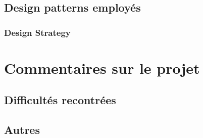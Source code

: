 \documentclass{article}
\begin{document}
    \subsection{Design patterns employés}

        \subsubsection{Design Strategy}
        
\section{Commentaires sur le projet}

    \subsection{Difficultés recontrées}
    
    \subsection{Autres}
\end{document}
